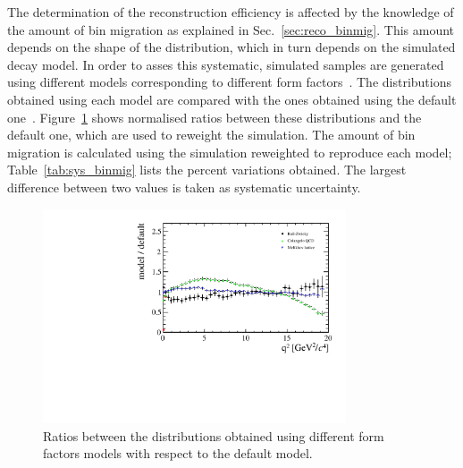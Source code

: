 The determination of the reconstruction efficiency is affected by the knowledge of the
amount of bin migration as explained in Sec.~\ref{sec:reco_binmig}. This amount depends
on the shape of the \qsq distribution, which in turn depends on the simulated \mbox{\BdToKstee} decay model.
In order to asses this systematic, simulated samples are generated using different
models corresponding to different form factors~\cite{Ball:2004ye,Melikhov:2000yu}.
The \qsq distributions obtained using each model are compared with the ones obtained using
the default one~\cite{Ali:1999mm}.
Figure~\ref{fig:q2ratios} shows normalised ratios between these \qsq distributions and the default one, 
which are used to reweight the simulation. The amount of bin migration is calculated
using the simulation reweighted to reproduce each model; Table~\ref{tab:sys_binmig} lists the
percent variations obtained. The largest difference between two values is taken as systematic uncertainty.
%
\begin{figure}[h!]
\centering \includegraphics[width=0.8\textwidth]{RKst/figs/models_ratios.pdf}
\caption{Ratios between the \qsq distributions obtained using different form
factors models with respect to the default model. }
\label{fig:q2ratios}
\end{figure}
%
\begin{table}[h!]
\centering
\caption{Percent variation on the bin migration amount obtained using different form factors models.}
\label{tab:sys_binmig}
\end{table}




